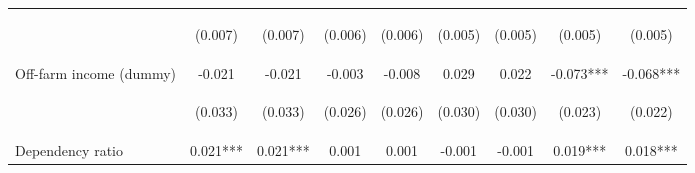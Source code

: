 \begin{center}
\begin{tabular}{lcccccccc}
\vspace{4pt} & \begin{footnotesize}(0.007)\end{footnotesize} & \begin{footnotesize}(0.007)\end{footnotesize} & \begin{footnotesize}(0.006)\end{footnotesize} & \begin{footnotesize}(0.006)\end{footnotesize} & \begin{footnotesize}(0.005)\end{footnotesize} & \begin{footnotesize}(0.005)\end{footnotesize} & \begin{footnotesize}(0.005)\end{footnotesize} & \begin{footnotesize}(0.005)\end{footnotesize} \\
Off-farm income (dummy) & -0.021 & -0.021 & -0.003 & -0.008 & 0.029 & 0.022 & -0.073*** & -0.068*** \\
\vspace{4pt} & \begin{footnotesize}(0.033)\end{footnotesize} & \begin{footnotesize}(0.033)\end{footnotesize} & \begin{footnotesize}(0.026)\end{footnotesize} & \begin{footnotesize}(0.026)\end{footnotesize} & \begin{footnotesize}(0.030)\end{footnotesize} & \begin{footnotesize}(0.030)\end{footnotesize} & \begin{footnotesize}(0.023)\end{footnotesize} & \begin{footnotesize}(0.022)\end{footnotesize} \\
Dependency ratio & 0.021*** & 0.021*** & 0.001 & 0.001 & -0.001 & -0.001 & 0.019*** & 0.018*** \\

\end{tabular}
\end{center}
